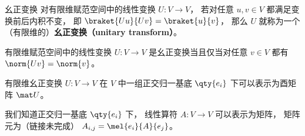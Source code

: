 
\begin{issues}
\issueDraft
\end{issues}


\begin{definition}{幺正变换}
对有限维赋范空间中的线性变换 $U: V\to V$， 若对任意 $u, v \in V$ 都满足变换前后内积不变， 即 $\braket{Uu}{Uv} = \braket{u}{v}$， 那么 $U$ 就称为一个（有限维的）\textbf{幺正变换（unitary transform）}。
\end{definition}

\begin{theorem}{}
有限维赋范空间中的线性变换 $U: V\to V$ 是幺正变换当且仅当对任意 $v\in V$ 都有 $\norm{Uv} = \norm{v}$。
\end{theorem}

\begin{theorem}{}
有限维幺正变换 $U: V\to V$ 在 $V$ 中一组正交归一基底 $\qty{e_i}$ 下可以表示为酉矩阵 $\mat U$。
\end{theorem}
我们知道正交归一基底 $\qty{e_i}$ 下， 线性算符 $A:V\to V$ 可以表示为矩阵， 矩阵元为（链接未完成） $A_{i,j} = \mel{e_i}{A}{e_j}$。
